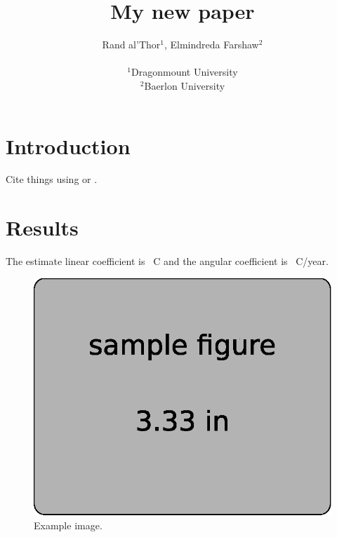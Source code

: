 \documentclass[twocolumn]{article}
\begin{document}
\title{
    My new paper
}
\author{
    Rand al'Thor$^{1}$,
    Elmindreda Farshaw$^{2}$
    \\\\
    {\small
        $^1$Dragonmount University
    }
    \\
    {\small
        $^2$Baerlon University
    }
}


\maketitle


\begin{abstract}
    \lipsum[1]
\end{abstract}


\section{Introduction}

Cite things using \citet{tikhonov1977} or \citep{tikhonov1977}.


\section{Results}

The estimate linear coefficient is \HawaiiLinearCoef\ C and the angular
coefficient is \HawaiiAngularCoef\ C/year.

\begin{figure}
    \centering
    \includegraphics[]{figures/example}
    \caption{
        Example image.
    }
    \label{fig:meh}
\end{figure}
\end{document}
